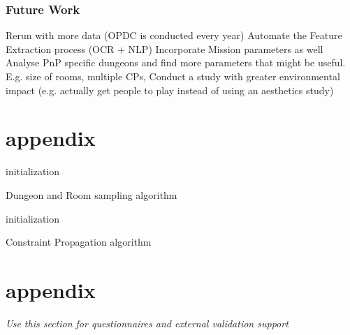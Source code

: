 \documentclass{UoYCSproject}
\begin{document}
\subsection{Future Work}
\begin{outline}[enumerate]
  \1 Rerun with more data (OPDC is conducted every year)
  \1 Automate the Feature Extraction process (OCR + NLP)
  \1 Incorporate Mission parameters as well
  \1 Analyse PnP specific dungeons and find more parameters that might be useful. E.g. size of rooms, multiple CPs, 
  \1 Conduct a study with greater environmental impact (e.g. actually get people to play instead of using an aesthetics study)
\end{outline}


\appendix
\chapter{appendix}
\label{cha:aA}
\begin{algorithm}[H]
  \SetAlgoLined
   initialization\;
   \caption{Dungeon and Room sampling algorithm}
   \label{algo:sampling}
  \end{algorithm}

  \begin{algorithm}[H]
    \SetAlgoLined
     initialization\;
     \caption{Constraint Propagation algorithm}
     \label{algo:CSP}
    \end{algorithm}

\chapter{appendix}
\label{cha:aB}
\textit{Use this section for questionnaires and external validation support}

\printbibliography
\end{document}
